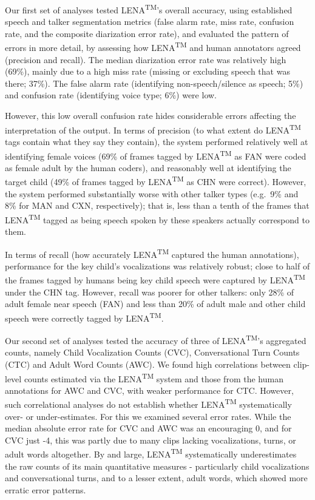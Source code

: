 \documentclass[english,floatsintext,man]{apa6}
\begin{document}
Our first set of analyses tested LENA\textsuperscript{TM}'s overall
accuracy, using established speech and talker segmentation metrics
(false alarm rate, miss rate, confusion rate, and the composite
diarization error rate), and evaluated the pattern of errors in more
detail, by assessing how LENA\textsuperscript{TM} and human annotators
agreed (precision and recall). The median diarization error rate was
relatively high (69\%), mainly due to a high miss rate (missing or
excluding speech that was there; 37\%). The false alarm rate
(identifying non-speech/silence as speech; 5\%) and confusion rate
(identifying voice type; 6\%) were low.

However, this low overall confusion rate hides considerable errors
affecting the interpretation of the output. In terms of precision (to
what extent do LENA\textsuperscript{TM} tags contain what they say they
contain), the system performed relatively well at identifying female
voices (69\% of frames tagged by LENA\textsuperscript{TM} as FAN were
coded as female adult by the human coders), and reasonably well at
identifying the target child (49\% of frames tagged by
LENA\textsuperscript{TM} as CHN were correct). However, the system
performed substantially worse with other talker types (e.g.~9\% and 8\%
for MAN and CXN, respectively); that is, less than a tenth of the frames
that LENA\textsuperscript{TM} tagged as being speech spoken by these
speakers actually correspond to them.

In terms of recall (how accurately LENA\textsuperscript{TM} captured the
human annotations), performance for the key child's vocalizations was
relatively robust; close to half of the frames tagged by humans being
key child speech were captured by LENA\textsuperscript{TM} under the CHN
tag. However, recall was poorer for other talkers: only 28\% of adult
female near speech (FAN) and less than 20\% of adult male and other
child speech were correctly tagged by LENA\textsuperscript{TM}.

Our second set of analyses tested the accuracy of three of
LENA\textsuperscript{TM}'s aggregated counts, namely Child Vocalization
Counts (CVC), Conversational Turn Counts (CTC) and Adult Word Counts
(AWC). We found high correlations between clip-level counts estimated
via the LENA\textsuperscript{TM} system and those from the human
annotations for AWC and CVC, with weaker performance for CTC. However,
such correlational analyses do not establish whether
LENA\textsuperscript{TM} systematically over- or under-estimates. For
this we examined several error rates. While the median absolute error
rate for CVC and AWC was an encouraging 0, and for CVC just -4, this was
partly due to many clips lacking vocalizations, turns, or adult words
altogether. By and large, LENA\textsuperscript{TM} systematically
underestimates the raw counts of its main quantitative measures -
particularly child vocalizations and conversational turns, and to a
lesser extent, adult words, which showed more erratic error patterns.
\end{document}
